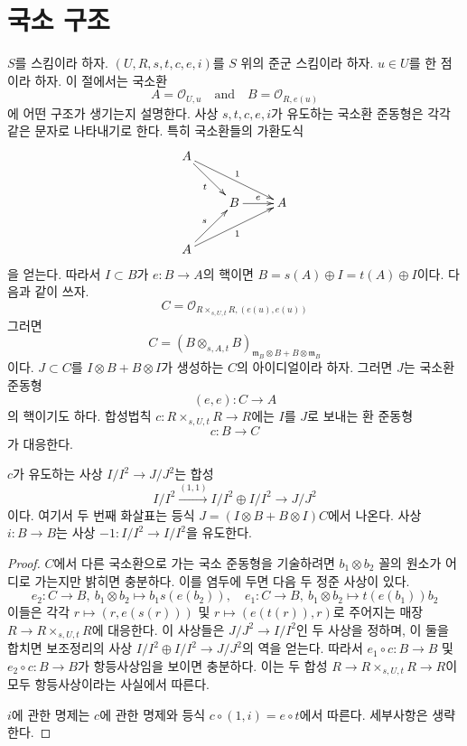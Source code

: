 \section{국소 구조}
\label{section-local}

\noindent
$S$를 스킴이라 하자.
$(U, R, s, t, c, e, i)$를 $S$ 위의 준군 스킴이라 하자.
$u \in U$를 한 점이라 하자. 이 절에서는 국소환
$$
A = \mathcal{O}_{U, u}
\quad\text{and}\quad
B = \mathcal{O}_{R, e(u)}
$$
에 어떤 구조가 생기는지 설명한다. 사상 $s, t, c, e, i$가 유도하는
국소환 준동형은 각각 같은 문자로 나타내기로 한다.
특히 국소환들의 가환도식
$$
\xymatrix{
A \ar[rd]_t \ar[rrd]^1 \\
& B \ar[r]^e & A \\
A \ar[ru]^s \ar[rru]_1
}
$$
을 얻는다. 따라서 $I \subset B$가 $e : B \to A$의 핵이면
$B = s(A) \oplus I = t(A) \oplus I$이다. 다음과 같이 쓰자.
$$
C = \mathcal{O}_{R \times_{s, U, t} R, (e(u), e(u))}
$$
그러면
$$
C = (B \otimes_{s, A, t} B)_{\mathfrak m_B \otimes B + B \otimes \mathfrak m_B}
$$
이다. $J \subset C$를 $I \otimes B + B \otimes I$가 생성하는 $C$의
아이디얼이라 하자. 그러면 $J$는 국소환 준동형
$$
(e, e) : C \longrightarrow A
$$
의 핵이기도 하다. 합성법칙 $c : R \times_{s, U, t} R \to R$에는
$I$를 $J$로 보내는 환 준동형
$$
c : B \longrightarrow C
$$
가 대응한다.

\begin{lemma}
\label{lemma-first-order-structure-c}
$c$가 유도하는 사상 $I/I^2 \to J/J^2$는 합성
$$
I/I^2 \xrightarrow{(1, 1)} I/I^2 \oplus I/I^2 \to J/J^2
$$
이다. 여기서 두 번째 화살표는 등식
$J = (I \otimes B + B \otimes I)C$에서 나온다.
사상 $i : B \to B$는 사상 $-1 : I/I^2 \to I/I^2$을 유도한다.
\end{lemma}

\begin{proof}
$C$에서 다른 국소환으로 가는 국소 준동형을 기술하려면
$b_1 \otimes b_2$ 꼴의 원소가 어디로 가는지만 밝히면 충분하다.
이를 염두에 두면 다음 두 정준 사상이 있다.
$$
e_2 : C \to B,\ b_1 \otimes b_2 \mapsto b_1s(e(b_2)),\quad
e_1 : C \to B,\ b_1 \otimes b_2 \mapsto t(e(b_1))b_2
$$
이들은 각각 $r \mapsto (r, e(s(r)))$ 및 $r \mapsto (e(t(r)), r)$로
주어지는 매장 $R \to R \times_{s, U, t} R$에 대응한다.
이 사상들은 $J/J^2 \to I/I^2$인 두 사상을 정하며, 이 둘을 합치면
보조정리의 사상 $I/I^2 \oplus I/I^2 \to J/J^2$의 역을 얻는다.
따라서 $e_1 \circ c : B \to B$ 및 $e_2 \circ c : B \to B$가
항등사상임을 보이면 충분하다. 이는 두 합성
$R \to R \times_{s, U, t} R \to R$이 모두 항등사상이라는 사실에서 따른다.

\medskip\noindent
$i$에 관한 명제는 $c$에 관한 명제와 등식
$c \circ (1, i) = e \circ t$에서 따른다. 세부사항은 생략한다.
\end{proof}







